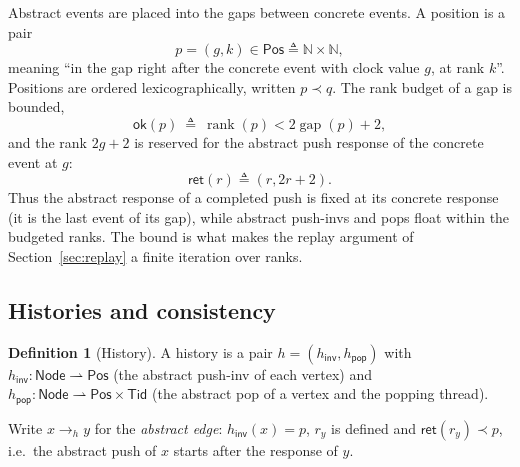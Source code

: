 \documentclass[11pt]{article}
\theoremstyle{definition}
\newtheorem{definition}[lemma]{Definition}
\theoremstyle{remark}
\newcommand{\Tid}{\mathsf{Tid}}
\newcommand{\Node}{\mathsf{Node}}
\newcommand{\Pos}{\mathsf{Pos}}
\newcommand{\gap}{\mathop{\mathrm{gap}}}
\newcommand{\rank}{\mathop{\mathrm{rank}}}
\newcommand{\lt}{\prec}
\newcommand{\ret}{\mathsf{ret}}
\newcommand{\pop}{\mathsf{pop}}
\newcommand{\inv}{\mathsf{inv}}
\begin{document}
Abstract events are placed into the gaps between concrete events.  A position
is a pair
\[
  p=(g,k)\in\Pos\triangleq\mathbb N\times\mathbb N,
\]
meaning ``in the gap right after the concrete event with clock value \(g\),
at rank \(k\)''.  Positions are ordered lexicographically, written
\(p\lt q\).  The rank budget of a gap is bounded,
\[
  \mathsf{ok}(p)\ \triangleq\ \rank(p)<2\gap(p)+2,
\]
and the rank \(2g+2\) is reserved for the abstract push response of the
concrete event at \(g\):
\[
  \ret(r)\triangleq(r,2r+2).
\]
Thus the abstract response of a completed push is fixed at its concrete
response (it is the last event of its gap), while abstract push-invs and pops
float within the budgeted ranks.  The bound is what makes the replay argument
of Section~\ref{sec:replay} a finite iteration over ranks.

\subsection{Histories and consistency}

\begin{definition}[History]
A history is a pair \(h=(h_\inv,h_\pop)\) with
\(h_\inv:\Node\rightharpoonup\Pos\) (the abstract push-inv of each vertex)
and \(h_\pop:\Node\rightharpoonup\Pos\times\Tid\) (the abstract pop of a
vertex and the popping thread).
\end{definition}

Write \(x\to_h y\) for the \emph{abstract edge}: \(h_\inv(x)=p\), \(r_y\)
is defined and \(\ret(r_y)\lt p\), i.e.\ the abstract push of \(x\) starts
after the response of \(y\).
\end{document}
